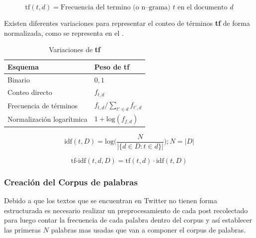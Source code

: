 \begin{equation} \label{eq:tf-repr}
  \text{tf}(t,d) = \text{Frecuencia del termino (o n--grama) } t \text{ en el documento } d
\end{equation}

Existen diferentes variaciones para representar el conteo de términos \textbf{tf} de forma normalizada, como se representa en el .

\begin{table}[h!]
\centering
\begin{tabular}{|l|l|} \hline
  \textbf{Esquema}          & \textbf{Peso de tf} \\ \hline
  Binario                   & $0, 1$ \\ \hline
  Conteo directo            & $f_{t, d}$ \\ \hline
  Frecuencia de términos    & $f_{t, d} / \sum_{t' \in d}f_{t', d}$ \\ \hline
  Normalización logarítmica & $1 + \text{log}(f_{f, d})$ \\ \hline
\end{tabular}
\caption{Variaciones de \textbf{tf}}
\label{table:tf}
\end{table}

\begin{equation} \label{eq:idf-repr}
  \text{idf}(t, D) = \text{log}\Bigg( \frac{N}{|\{d \in D : t \in d\}|} \Bigg) ; N = |D|
\end{equation}

\begin{equation} \label{eq:tfidf-repr}
  \text{tf-idf}(t, d, D) = \text{tf}(t, d) \cdot \text{idf}(t, D)
\end{equation}

\subsubsection{Creación del Corpus de palabras}
Debido a que los textos que se encuentran en Twitter no tienen forma estructurada es necesario realizar un preprocesamiento de cada post recolectado para luego contar la frecuencia de cada palabra dentro del corpus y así establecer las primeras $N$ palabras mas usadas que van a componer el corpus de palabras.

